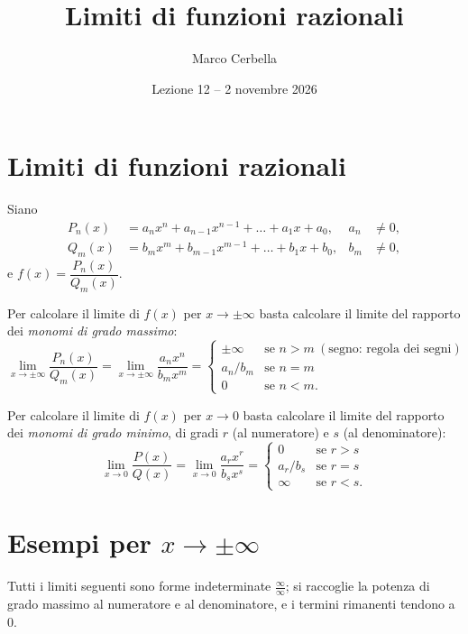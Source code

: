 \documentclass[11pt,a4paper]{article}
\title{Limiti di funzioni razionali}
\author{Marco Cerbella}
\date{Lezione 12 -- 2 novembre 2026}
\begin{document}
\maketitle

\section{Limiti di funzioni razionali}

Siano
\[
\begin{aligned} P_n(x) &= a_n x^n + a_{n-1}x^{n-1} + \dots + a_1 x + a_0, & a_n &\neq 0, \\ Q_m(x) &= b_m x^m + b_{m-1}x^{m-1} + \dots + b_1 x + b_0, & b_m &\neq 0 , \end{aligned}
\]
e $f(x) = \dfrac{P_n(x)}{Q_m(x)}$.

\begin{proprieta}
Per calcolare il limite di $f(x)$ per $x \to \pm\infty$ basta calcolare il limite del rapporto dei \emph{monomi di grado massimo}:
\[
\lim_{x\to\pm\infty}\frac{P_n(x)}{Q_m(x)} = \lim_{x\to\pm\infty}\frac{a_n x^n}{b_m x^m} =
\begin{cases} \pm\infty & \text{se } n > m \ (\text{segno: regola dei segni}) \\ a_n/b_m & \text{se } n = m \\ 0 & \text{se } n < m . \end{cases}
\]
\end{proprieta}

\begin{proprieta}
Per calcolare il limite di $f(x)$ per $x \to 0$ basta calcolare il limite del rapporto dei \emph{monomi di grado minimo}, di gradi $r$ (al numeratore) e $s$ (al denominatore):
\[
\lim_{x\to 0}\frac{P(x)}{Q(x)} = \lim_{x\to 0}\frac{a_r x^r}{b_s x^s} =
\begin{cases} 0 & \text{se } r > s \\ a_r/b_s & \text{se } r = s \\ \infty & \text{se } r < s . \end{cases}
\]
\end{proprieta}

\section{Esempi per $x \to \pm\infty$}

Tutti i limiti seguenti sono forme indeterminate $\frac{\infty}{\infty}$; si raccoglie la potenza di grado massimo al numeratore e al denominatore, e i termini rimanenti tendono a $0$.
\end{document}
